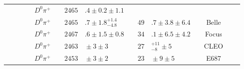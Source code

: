 \begin{adjustbox}{width=0.76\textwidth,center}
{\begin{tabular}{cp{5pt}cp{5pt}cp{5pt}r@{}lp{5pt}r@{}lp{5pt}cp{5pt}c}
		                                         &                  &                              &                  & $D^{0}\pi^{+}$                  &                       & $	2465$                       & $.4\pm0.2\pm1.1	$                             &                       &                                                  &                                              &                       & \babar{}                                                      &                       & \cite{delAmoSanchez:2010vq}               \\
		                                         &                  &                              &                  & $D^{0}\pi^{+}$                  &                       & $	2465$                       & $.7\pm1.8^{+1.4}_{-4.8}	$                     &                       & $	49$                                            & $.7\pm3.8\pm6.4	$                            &                       & Belle                                                         &                       & \cite{Kuzmin:2006mw}                      \\
		                                         &                  &                              &                  & $D^{0}\pi^{+}$                  &                       & $	2467$                       & $.6\pm1.5\pm0.8	$                             &                       & $	34$                                            & $.1\pm6.5\pm4.2	$                            &                       & Focus                                                         &                       & \cite{Link:2003bd}                        \\
		                                         &                  &                              &                  & $D^{0}\pi^{+}$                  &                       & $	2463$                       & ${}\pm3\pm3	$                                 &                       & $	27$                                            & ${}^{+11}_{-8}\pm5	$                         &                       & CLEO                                                          &                       & \cite{Bergfeld:1994af}                    \\
		                                         &                  &                              &                  & $D^{0}\pi^{+}$                  &                       & $	2453$                       & ${}\pm3\pm2	$                                 &                       & $	23$                                            & ${}\pm9\pm5	$                                &                       & E687                                                          &                       & \cite{Frabetti:1993vv}                    \\

\end{tabular}}
\end{adjustbox}
